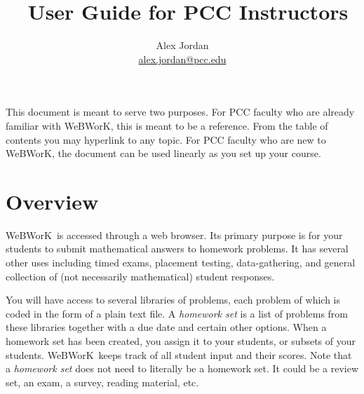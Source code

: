 \documentclass[12pt]{article}
\title{\WW\ User Guide for PCC Instructors}
\author{Alex Jordan\\\href{mailto:alex.jordan@pcc.edu}{alex.jordan@pcc.edu}}
\newcommand{\WW}{WeBWorK}
\begin{document}
\maketitle

This document is meant to serve two purposes.
For PCC faculty who are already familiar with \WW, this is meant to be a reference.
From the table of contents you may hyperlink to any topic.
For PCC faculty who are new to \WW, the document can be used linearly as you set up your course.

\footnotesize
\setcounter{tocdepth}{2}
\tableofcontents

\setlength{\parskip}{10pt}

\newpage
\normalsize

\section{Overview}

\WW\ is accessed through a web browser.
Its primary purpose is for your students to submit mathematical answers to homework problems.
It has several other uses including timed exams, placement testing, data-gathering, and general collection of (not necessarily mathematical) student responses.

You will have access to several libraries of problems, each problem of which is coded in the form of a plain text file.
A \emph{homework set} is a list of problems from these libraries together with a due date and certain other options.
When a homework set has been created, you assign it to your students, or subsets of your students.
\WW\ keeps track of all student input and their scores.
Note that a \emph{homework set} does not need to literally be a homework set.
It could be a review set, an exam, a survey, reading material, etc.
\end{document}
